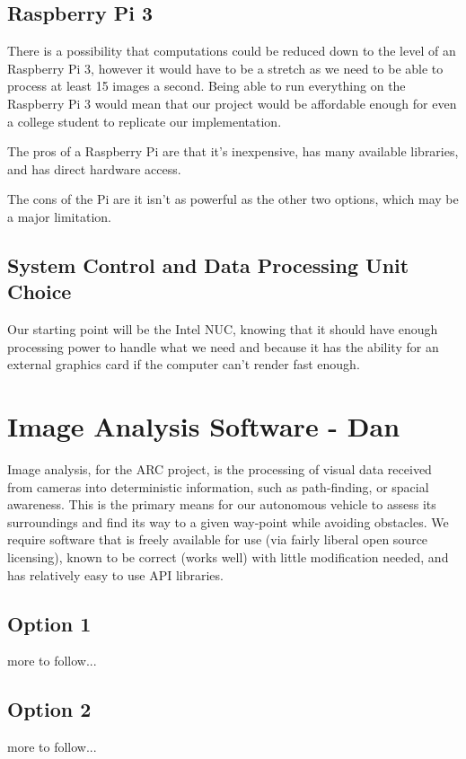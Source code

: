 \documentclass[compsoc,draftclsnofoot,onecolumn,10pt]{IEEEtran}
\begin{document}
\subsection{Raspberry Pi 3}
There is a possibility that  computations could be reduced down to the level of an Raspberry Pi 3, however it would have to be a stretch as we need to be able to process at least 15 images a second. 
Being able to run everything on the Raspberry Pi 3 would mean that our project would be affordable enough for even a college student to replicate our implementation. \par
The pros of a Raspberry Pi are that it's inexpensive, has many available libraries, and has direct hardware access. \par
The cons of the Pi are it isn't as powerful as the other two options, which may be a major limitation. 

\subsection{System Control and Data Processing Unit Choice}
Our starting point will be the Intel NUC, knowing that it should have enough processing power to handle what we need and because it has the ability for an external graphics card if the computer can't render fast enough. 


\newpage

\section{Image Analysis Software - Dan}
Image analysis, for the ARC project, is the processing of visual data received
from cameras into deterministic information, such as path-finding, or spacial
awareness. This is the primary means for our autonomous vehicle to assess its
surroundings and find its way to a given way-point while avoiding obstacles. We
require software that is freely available for use (via fairly liberal open
source licensing), known to be correct (works well) with little modification
needed, and has relatively easy to use API libraries.

\subsection{Option 1}
more to follow...

\subsection{Option 2}
more to follow...
\end{document}
